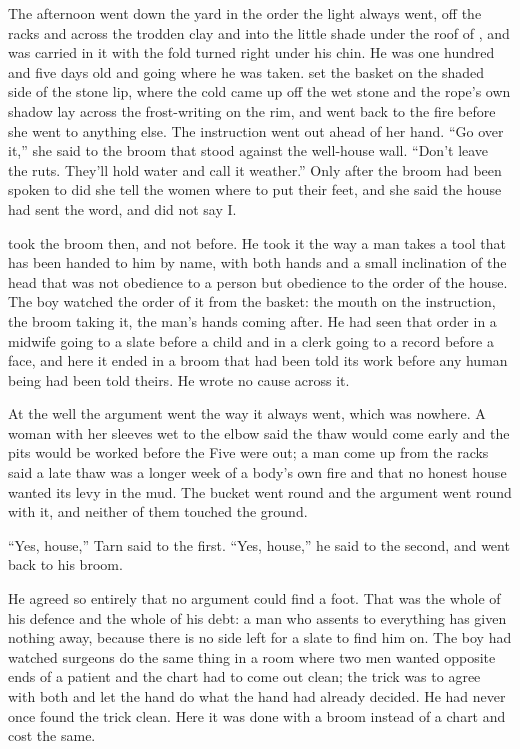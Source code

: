 The afternoon went down the yard in the order the light always went, off the racks and across the trodden clay and into the little shade under the roof of , and  was carried in it with the fold turned right under his chin. He was one hundred and five days old and going where he was taken.  set the basket on the shaded side of the stone lip, where the cold came up off the wet stone and the rope's own shadow lay across the frost-writing on the rim, and went back to the fire before she went to anything else. The instruction went out ahead of her hand. “Go over it,” she said to the broom that stood against the well-house wall. “Don't leave the ruts. They'll hold water and call it weather.” Only after the broom had been spoken to did she tell the women where to put their feet, and she said the house had sent the word, and did not say I.

 took the broom then, and not before. He took it the way a man takes a tool that has been handed to him by name, with both hands and a small inclination of the head that was not obedience to a person but obedience to the order of the house. The boy watched the order of it from the basket: the mouth on the instruction, the broom taking it, the man's hands coming after. He had seen that order in a midwife going to a slate before a child and in a clerk going to a record before a face, and here it ended in a broom that had been told its work before any human being had been told theirs. He wrote no cause across it.

At the well the argument went the way it always went, which was nowhere. A woman with her sleeves wet to the elbow said the thaw would come early and the pits would be worked before the Five were out; a man come up from the racks said a late thaw was a longer week of a body's own fire and that no honest house wanted its levy in the mud. The bucket went round and the argument went round with it, and neither of them touched the ground.

“Yes, house,” Tarn said to the first. “Yes, house,” he said to the second, and went back to his broom.

He agreed so entirely that no argument could find a foot. That was the whole of his defence and the whole of his debt: a man who assents to everything has given nothing away, because there is no side left for a slate to find him on. The boy had watched surgeons do the same thing in a room where two men wanted opposite ends of a patient and the chart had to come out clean; the trick was to agree with both and let the hand do what the hand had already decided. He had never once found the trick clean. Here it was done with a broom instead of a chart and cost the same.

